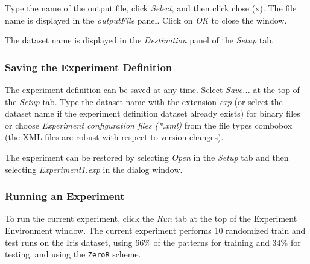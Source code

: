 \documentclass[a4paper]{article}
\begin{document}
\begin{center}
\end{center}

Type the name of the output file, click \textit{Select}, and then click close (x). The file name is displayed in the \textit{outputFile} panel. Click on \textit{OK} to close the window.
\begin{center}
\end{center}

The dataset name is displayed in the \textit{Destination} panel of the \textit{Setup} tab.
\begin{center}
\end{center}



\subsubsection*{Saving the Experiment Definition}

The experiment definition can be saved at any time. Select \textit{Save...} at the top of the \textit{Setup} tab. Type the dataset name with the extension \textit{exp} (or select the dataset name if the experiment definition dataset already exists) for binary files or choose \textit{Experiment configuration files (*.xml)} from the file types combobox (the XML files are robust with respect to version changes).
\begin{center}
\end{center}


The experiment can be restored by selecting \textit{Open} in the \textit{Setup} tab and then selecting \textit{Experiment1.exp} in the dialog window.



\subsubsection{Running an Experiment}

To run the current experiment, click the \textit{Run} tab at the top of the Experiment Environment window. The current experiment performs 10 randomized train and test runs on the Iris dataset, using 66\% of the patterns for training and 34\% for testing, and using the \texttt{ZeroR} scheme.
\begin{center}
\end{center}
\end{document}
